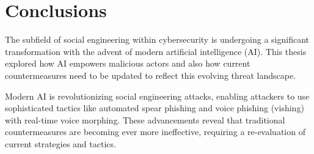 



\chapter{Conclusions\label{chapter:conclusions}}

\begin{comment}

Guides:
    - 1 to 3 pages max?
    - No subsections

TODO:
    [ ] How AI has augmented SE attacks and countermeasures
    [ ] Gap in the literature

What to cover:
    - How AI has augmented SE attacks and countermeasures
    - Gap in the literature regarding SE and AI intersection?
    - Analysis on where AI-powered SE attacks might be headed in the future
        - Also about robotics and human-like actors
    - What organizations and individuals need to do regarding the evolving landscape of SE attacks

Speculation:
    - Drones dropping USB thumbdrives?
    - Human-like android as threat actors
    - Impact of robotics on dumpster diving, shoulder surfing and baiting
    
Literature:
    - Gen and detection of deepfakes

From training material:
    - "Yhteenveto vaatimattomimmillaan on vain lyhyt kertaus kirjoituksen keskeisistä asioista. Arvokkaamman yhteenvedon saa aikaan kommentoimalla työn tulosten arvoa, työn liittymistä ympäristöön ja tulevaisuudennäkymiä. Tällaiset arviot huolellisesti perusteltava."
    - "Yhteenvetoluku kuvaa teknisten johtopäätösten tuomaa impaktia"

\end{comment}

The subfield of social engineering within cybersecurity is undergoing a significant transformation with the advent of modern artificial intelligence (AI). This thesis explored how AI empowers malicious actors and also how current countermeasures need to be updated to reflect this evolving threat landscape.

Modern AI is revolutionizing social engineering attacks, enabling attackers to use sophisticated tactics like automated spear phishing and voice phishing (vishing) with real-time voice morphing. These advancements reveal that traditional countermeasures are becoming ever more ineffective, requiring a re-evaluation of current strategies and tactics.

